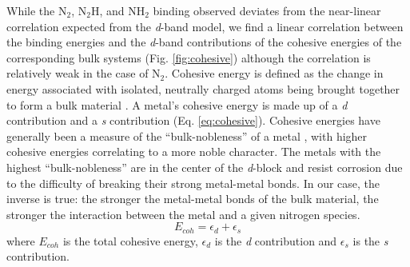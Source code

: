 While the N$_2$, N$_2$H, and NH$_2$ binding observed deviates from the near-linear correlation expected from the \textit{d}-band model, we find a linear correlation between the binding energies and the \textit{d}-band contributions of the cohesive energies of the corresponding bulk systems (Fig. \ref{fig:cohesive}) although the correlation is relatively weak in the case of N$_2$. Cohesive energy is defined as the change in energy associated with isolated, neutrally charged atoms being brought together to form a bulk material \cite{Laughlin_2014}. A metal's cohesive energy is made up of a \textit{d} contribution and a \textit{s} contribution (Eq. \ref{eq:cohesive}). Cohesive energies have generally been a measure of the ``bulk-nobleness'' of a metal \cite{Hammer_1995}, with higher cohesive energies correlating to a more noble character. The metals with the highest ``bulk-nobleness'' are in the center of the \textit{d}-block and resist corrosion due to the difficulty of breaking their strong metal-metal bonds. In our case, the inverse is true: the stronger the metal-metal bonds of the bulk material, the stronger the interaction between the metal and a given nitrogen species.
\begin{equation}
    E_{coh} = \epsilon_d + \epsilon_s
    \label{eq:cohesive}
\end{equation}
where $E_{coh}$ is the total cohesive energy, $\epsilon_d$ is the \textit{d} contribution and $\epsilon_s$ is the \textit{s} contribution.


